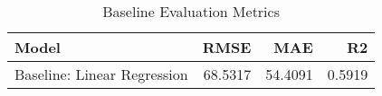 \begin{table}
\centering
\caption{Baseline Evaluation Metrics}
\begin{tabular}{lrrr}
\toprule
                      Model &    RMSE &     MAE &     R2 \\
\midrule
Baseline: Linear Regression & 68.5317 & 54.4091 & 0.5919 \\
\bottomrule
\end{tabular}
\end{table}
